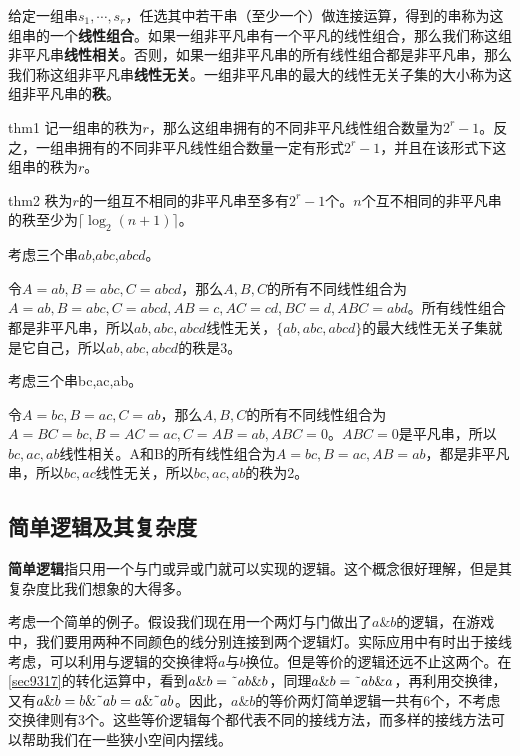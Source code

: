 给定一组串$s_1,\cdots,s_r$，任选其中若干串（至少一个）做连接运算，得到的串称为这组串的一个\textbf{线性组合}。如果一组非平凡串有一个平凡的线性组合，那么我们称这组非平凡串\textbf{线性相关}。否则，如果一组非平凡串的所有线性组合都是非平凡串，那么我们称这组非平凡串\textbf{线性无关}。一组非平凡串的最大的线性无关子集的大小称为这组非平凡串的\textbf{秩}。
\begin{theorem}{}{thm1}
  记一组串的秩为$r$，那么这组串拥有的不同非平凡线性组合数量为$2^r-1$。反之，一组串拥有的不同非平凡线性组合数量一定有形式$2^r-1$，并且在该形式下这组串的秩为$r$。
\end{theorem}
\begin{corollary}{}{thm2}
  秩为$r$的一组互不相同的非平凡串至多有$2^r-1$个。$n$个互不相同的非平凡串的秩至少为$\lceil\log_2 (n+1)\rceil$。
\end{corollary}

\begin{example}{}{}
  考虑三个串$ab$,$abc$,$abcd$。

  令$A=ab,B=abc,C=abcd$，那么$A,B,C$的所有不同线性组合为$A=ab,B=abc,C=abcd,AB=c,AC=cd,BC=d,ABC=abd$。所有线性组合都是非平凡串，所以$ab,abc,abcd$线性无关，$\{ab,abc,abcd\}$的最大线性无关子集就是它自己，所以$ab,abc,abcd$的秩是3。
\end{example}

\begin{example}{}{}
  考虑三个串bc,ac,ab。

  令$A=bc,B=ac,C=ab$，那么$A,B,C$的所有不同线性组合为$A=BC=bc,B=AC=ac,C=AB=ab,ABC=0$。$ABC=0$是平凡串，所以$bc,ac,ab$线性相关。A和B的所有线性组合为$A=bc,B=ac,AB=ab$，都是非平凡串，所以$bc,ac$线性无关，所以$bc,ac,ab$的秩为2。
\end{example}

\subsection{简单逻辑及其复杂度}
\textbf{简单逻辑}指只用一个与门或异或门就可以实现的逻辑。这个概念很好理解，但是其复杂度比我们想象的大得多。

考虑一个简单的例子。假设我们现在用一个两灯与门做出了$a\&b$的逻辑，在游戏中，我们要用两种不同颜色的线分别连接到两个逻辑灯。实际应用中有时出于接线考虑，可以利用与逻辑的交换律将$a$与$b$换位。但是等价的逻辑还远不止这两个。在\autoref{sec9317}的转化运算中，看到$a\&b=\textrm{\~{}} ab\&b$，同理$a\&b=\textrm{\~{}} ab\&a$，再利用交换律，又有$a\&b=b\&\textrm{\~{}} ab=a\&\textrm{\~{}} ab$。因此，$a\&b$的等价两灯简单逻辑一共有6个，不考虑交换律则有3个。这些等价逻辑每个都代表不同的接线方法，而多样的接线方法可以帮助我们在一些狭小空间内摆线。

